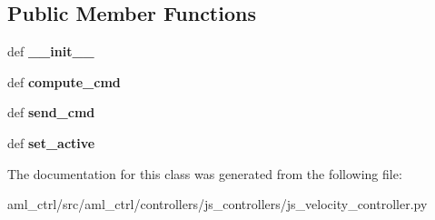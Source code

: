 \subsection*{Public Member Functions}
\begin{DoxyCompactItemize}
\item 
\hypertarget{classaml__ctrl_1_1controllers_1_1js__controllers_1_1js__velocity__controller_1_1_j_s_velocity_controller_a0c6f0b13e7daa03a1bfd7caece9c5fa9}{def {\bfseries \-\_\-\-\_\-init\-\_\-\-\_\-}}\label{classaml__ctrl_1_1controllers_1_1js__controllers_1_1js__velocity__controller_1_1_j_s_velocity_controller_a0c6f0b13e7daa03a1bfd7caece9c5fa9}

\item 
\hypertarget{classaml__ctrl_1_1controllers_1_1js__controllers_1_1js__velocity__controller_1_1_j_s_velocity_controller_a44a6a78ee4cadaa5d8cc17ae4e12eac9}{def {\bfseries compute\-\_\-cmd}}\label{classaml__ctrl_1_1controllers_1_1js__controllers_1_1js__velocity__controller_1_1_j_s_velocity_controller_a44a6a78ee4cadaa5d8cc17ae4e12eac9}

\item 
\hypertarget{classaml__ctrl_1_1controllers_1_1js__controllers_1_1js__velocity__controller_1_1_j_s_velocity_controller_aede4b2b5b3738248611e8a7924b0022d}{def {\bfseries send\-\_\-cmd}}\label{classaml__ctrl_1_1controllers_1_1js__controllers_1_1js__velocity__controller_1_1_j_s_velocity_controller_aede4b2b5b3738248611e8a7924b0022d}

\item 
\hypertarget{classaml__ctrl_1_1controllers_1_1js__controllers_1_1js__velocity__controller_1_1_j_s_velocity_controller_a112eb082d2e93cc7b14cd3c0f4383e59}{def {\bfseries set\-\_\-active}}\label{classaml__ctrl_1_1controllers_1_1js__controllers_1_1js__velocity__controller_1_1_j_s_velocity_controller_a112eb082d2e93cc7b14cd3c0f4383e59}

\end{DoxyCompactItemize}


The documentation for this class was generated from the following file\-:\begin{DoxyCompactItemize}
\item 
aml\-\_\-ctrl/src/aml\-\_\-ctrl/controllers/js\-\_\-controllers/js\-\_\-velocity\-\_\-controller.\-py\end{DoxyCompactItemize}
